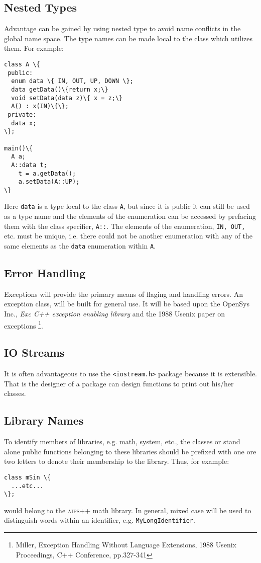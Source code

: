 \subsection{Nested Types}
Advantage can be gained by using nested type to avoid name conflicts in the 
global name space. The type names can be made local to the class which
utilizes them. For example:
\begin{verbatim}
class A \{
 public:
  enum data \{ IN, OUT, UP, DOWN \};
  data getData()\{return x;\}
  void setData(data z)\{ x = z;\}
  A() : x(IN)\{\};
 private:
  data x;
\};

main()\{
  A a;
  A::data t;
    t = a.getData();
    a.setData(A::UP);
\}
\end{verbatim}
\noindent
Here \texttt{data} is a type local to the class \texttt{A}, but since it is
public it can still be used as a type name and the elements of the 
enumeration can be accessed by prefacing them with the class specifier,
\texttt{A::}. The elements of the enumeration, \texttt{IN, OUT,} etc. must
be unique, i.e. there could not be another enumeration with any of the
same elements as the \texttt{data} enumeration within \texttt{A}.

\subsection{Error Handling}
Exceptions will provide the primary means of flaging and handling errors.
An exception class, will be built for general use. It will be based upon
the OpenSys Inc., \emph{Exc C++ exception enabling library} and the 
1988 Usenix paper on exceptions \footnote{Miller, Exception Handling Without
Language Extensions, 1988 Usenix Proceedings, C++ Conference, pp.327-341}.

\subsection{IO Streams}
It is often advantageous to use the \texttt{<iostream.h>} package because it
is extensible. That is the designer of a package can design functions to 
print out his/her classes.

\subsection{Library Names}
To identify members of libraries, e.g. math, system, etc., the classes 
or stand alone public functions belonging to these libraries should be 
prefixed with one ore two letters to denote their membership to the 
library. Thus, for example:
\begin{verbatim}
class mSin \{
  ...etc...
\};
\end{verbatim}
\noindent
would belong to the \textsc{aips++} math library. In general, mixed case will
be used to distinguish words within an identifier, e.g. 
\texttt{MyLongIdentifier}.

